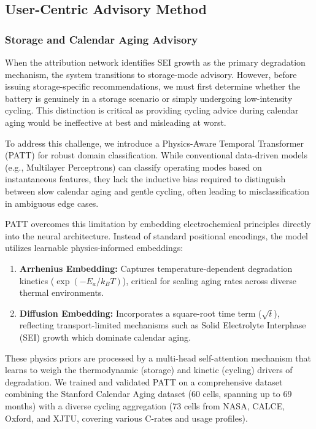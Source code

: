 \documentclass[5p,times,authoryear]{elsarticle}
\begin{document}
\subsection{User-Centric Advisory Method}



\subsubsection{Storage and Calendar Aging Advisory}

When the attribution network identifies SEI growth as the primary degradation mechanism, the system transitions to storage-mode advisory. However, before issuing storage-specific recommendations, we must first determine whether the battery is genuinely in a storage scenario or simply undergoing low-intensity cycling. This distinction is critical as providing cycling advice during calendar aging would be ineffective at best and misleading at worst.

To address this challenge, we introduce a Physics-Aware Temporal Transformer (PATT) for robust domain classification. While conventional data-driven models (e.g., Multilayer Perceptrons) can classify operating modes based on instantaneous features, they lack the inductive bias required to distinguish between slow calendar aging and gentle cycling, often leading to misclassification in ambiguous edge cases.

PATT overcomes this limitation by embedding electrochemical principles directly into the neural architecture. Instead of standard positional encodings, the model utilizes learnable physics-informed embeddings:
\begin{enumerate}
    \item \textbf{Arrhenius Embedding:} Captures temperature-dependent degradation kinetics ($\exp(-E_a/k_B T)$), critical for scaling aging rates across diverse thermal environments.
    \item \textbf{Diffusion Embedding:} Incorporates a square-root time term ($\sqrt{t}$), reflecting transport-limited mechanisms such as Solid Electrolyte Interphase (SEI) growth which dominate calendar aging.
\end{enumerate}

These physics priors are processed by a multi-head self-attention mechanism that learns to weigh the thermodynamic (storage) and kinetic (cycling) drivers of degradation. We trained and validated PATT on a comprehensive dataset combining the Stanford Calendar Aging dataset (60 cells, spanning up to 69 months) with a diverse cycling aggregation (73 cells from NASA, CALCE, Oxford, and XJTU, covering various C-rates and usage profiles).
\end{document}
